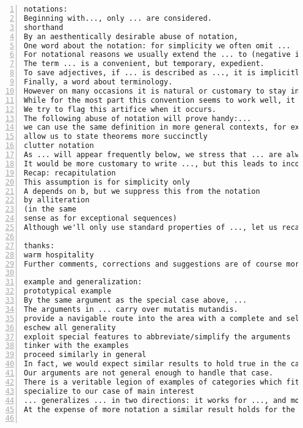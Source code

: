 \documentclass[11pt]{amsart}
\begin{document}
\begin{lstlisting}[numbers=left,numberstyle=\tiny,numbersep=10pt]
notations:
Beginning with..., only ... are considered.
shorthand
By an aesthentically desirable abuse of notation, 
One word about the notation: for simplicity we often omit ...
For notational reasons we usually extend the ... to (negative indices) by defining ...
The term ... is a convenient, but temporary, expedient.
To save adjectives, if ... is described as ..., it is implicitly assumed to be ...
Finally, a word about terminology.
However on many occasions it is natural or customary to stay in ... mode when nonetheless one has ... in mind.
While for the most part this convention seems to work well, it occasionally leads us to make extraneous ... hypotheses in order to invoke ...
We try to flag this artifice when it occurs.
The following abuse of notation will prove handy:...
we can use the same definition in more general contexts, for example, ...
allow us to state theorems more succinctly
clutter notation
As ... will appear frequently below, we stress that ... are always ... for us.
It would be more customary to write ..., but this leads to inconsistent notation.
Recap: recapitulation
This assumption is for simplicity only
A depends on b, but we suppress this from the notation
by alliteration
(in the same
sense as for exceptional sequences)
Although we'll only use standard properties of ..., let us recall a few definitions for the comfort of the reader.

thanks:
warm hospitality
Further comments, corrections and suggestions are of course more than welcome.

example and generalization:
prototypical example
By the same argument as the special case above, ...
The arguments in ... carry over mutatis mutandis.
provide a navigable route into the area with a complete and self-contained account of the case ...
eschew all generality
exploit special features to abbreviate/simplify the arguments
tinker with the examples
proceed similarly in general
In fact, we would expect similar results to hold true in the case where ...
Our arguments are not general enough to handle that case.
There is a veritable legion of examples of categories which fit this paradigm:...
specialize to our case of main interest
... generalizes ... in two directions: it works for ..., and moreover it deals with ... instead of ...
At the expense of more notation a similar result holds for the other...


\end{lstlisting}
\end{document}
